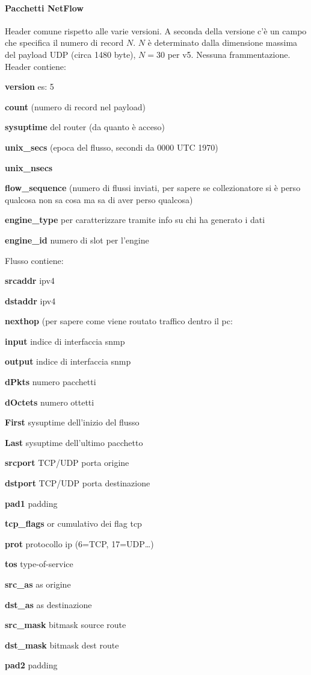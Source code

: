 \documentclass[10pt]{book}
\begin{document}
\paragraph{Pacchetti NetFlow} Header comune rispetto alle varie versioni. A seconda della versione c'è un campo che specifica il numero di record $N$. $N$ è determinato dalla dimensione massima del payload UDP (circa 1480 byte), $N=30$ per v5. Nessuna frammentazione.\\
Header contiene:\begin{list}{}{}
	\item \textbf{version} es: 5
	\item \textbf{count} (numero di record nel payload)
	\item \textbf{sysuptime} del router (da quanto è acceso)
	\item \textbf{unix\_secs} (epoca del flusso, secondi da 0000 UTC 1970)
	\item \textbf{unix\_nsecs}
	\item \textbf{flow\_sequence} (numero di flussi inviati, per sapere se collezionatore si è perso qualcosa non sa cosa ma sa di aver perso qualcosa)
	\item \textbf{engine\_type} per caratterizzare tramite info su chi ha generato i dati
	\item \textbf{engine\_id} numero di slot per l'engine
\end{list}
Flusso contiene:
\begin{multicols}{2}
 \begin{list}{}{}
	\item \textbf{srcaddr} ipv4
	\item \textbf{dstaddr} ipv4
	\item \textbf{nexthop} (per sapere come viene routato traffico dentro il pc: 
	\item \textbf{input} indice di interfaccia snmp
	\item \textbf{output} indice di interfaccia snmp
	\item \textbf{dPkts} numero pacchetti
	\item \textbf{dOctets} numero ottetti
	\item \textbf{First} sysuptime dell'inizio del flusso
	\item \textbf{Last} sysuptime dell'ultimo pacchetto
	\item \textbf{srcport} TCP/UDP porta origine
	\item \textbf{dstport} TCP/UDP porta destinazione
	\item \textbf{pad1} padding
	\item \textbf{tcp\_flags} or cumulativo dei flag tcp
	\item \textbf{prot} protocollo ip (6=TCP, 17=UDP\ldots)
	\item \textbf{tos} type-of-service
	\item \textbf{src\_as} as origine
	\item \textbf{dst\_as} as destinazione
	\item \textbf{src\_mask} bitmask source route
	\item \textbf{dst\_mask} bitmask dest route
	\item \textbf{pad2} padding
 \end{list}
\end{multicols}
\end{document}
